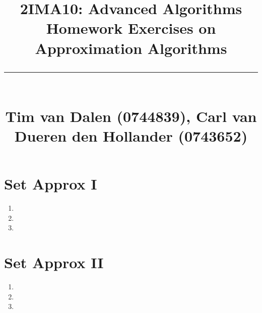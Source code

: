 \documentclass[a4paper,11pt]{article}
\title{
	\huge\raggedright 2IMA10: Advanced Algorithms \hfill\\{\Large Homework Exercises on Approximation Algorithms}\\ \vspace{-0.9\baselineskip}\rule{\linewidth}{1pt}\\
	\small\hfill Tim van Dalen (0744839), Carl van Dueren den Hollander (0743652)
	\normalsize
}
\begin{document}
	\maketitle

	\section*{Set Approx I}
		\begin{enumerate}
			\item 
			\item 
			\item 
		\end{enumerate}
	\section*{Set Approx II}
		\begin{enumerate}
			\item 
			\item 
			\item 
		\end{enumerate}
\end{document}
